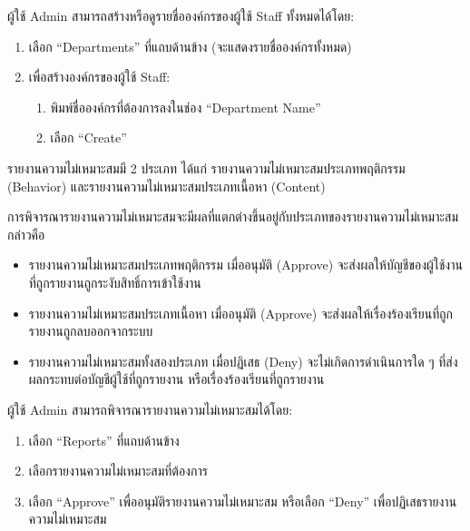 \pagebreak[4]



ผู้ใช้ Admin สามารถสร้างหรือดูรายชื่อองค์กรของผู้ใช้ Staff ทั้งหมดได้โดย:

\begin{enumerate}
    \item เลือก ``Departments'' ที่แถบด้านข้าง (จะแสดงรายชื่อองค์กรทั้งหมด)
    \item เพื่อสร้างองค์กรของผู้ใช้ Staff:
        \begin{enumerate}
            \item พิมพ์ชื่อองค์กรที่ต้องการลงในช่อง ``Department Name''
            \item เลือก ``Create''
        \end{enumerate}
\end{enumerate}


รายงานความไม่เหมาะสมมี 2 ประเภท ได้แก่ รายงานความไม่เหมาะสมประเภทพฤติกรรม (Behavior) และรายงานความไม่เหมาะสมประเภทเนื้อหา (Content)

การพิจารณารายงานความไม่เหมาะสมจะมีผลที่แตกต่างขึ้นอยู่กับประเภทของรายงานความไม่เหมาะสม กล่าวคือ

\begin{itemize}
    \item รายงานความไม่เหมาะสมประเภทพฤติกรรม เมื่ออนุมัติ (Approve) จะส่งผลให้บัญชีของผู้ใช้งานที่ถูกรายงานถูกระงับสิทธิ์การเข้าใช้งาน
    \item รายงานความไม่เหมาะสมประเภทเนื้อหา เมื่ออนุมัติ (Approve) จะส่งผลให้เรื่องร้องเรียนที่ถูกรายงานถูกลบออกจากระบบ
    \item รายงานความไม่เหมาะสมทั้งสองประเภท เมื่อปฏิเสธ (Deny) จะไม่เกิดการดำเนินการใด ๆ ที่ส่งผลกระทบต่อบัญชีผู้ใช้ที่ถูกรายงาน หรือเรื่องร้องเรียนที่ถูกรายงาน
\end{itemize}


ผู้ใช้ Admin สามารถพิจารณารายงานความไม่เหมาะสมได้โดย:

\begin{enumerate}
    \item เลือก ``Reports'' ที่แถบด้านข้าง
    \item เลือกรายงานความไม่เหมาะสมที่ต้องการ
    \item เลือก ``Approve'' เพื่ออนุมัติรายงานความไม่เหมาะสม หรือเลือก ``Deny'' เพื่อปฏิเสธรายงานความไม่เหมาะสม
\end{enumerate}

